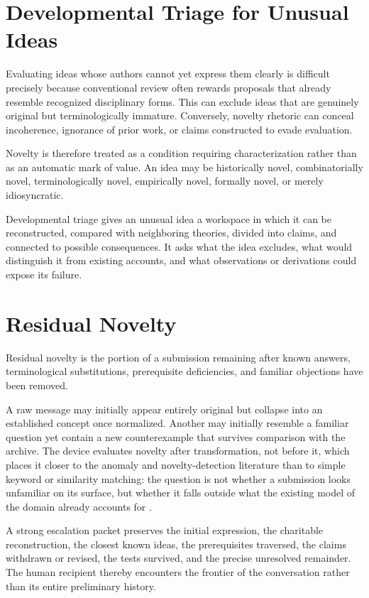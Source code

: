 \documentclass[11pt]{article}
\begin{document}
\section{Developmental Triage for Unusual Ideas}

Evaluating ideas whose authors cannot yet express them clearly is difficult precisely because conventional review often rewards proposals that already resemble recognized disciplinary forms. This can exclude ideas that are genuinely original but terminologically immature. Conversely, novelty rhetoric can conceal incoherence, ignorance of prior work, or claims constructed to evade evaluation.

Novelty is therefore treated as a condition requiring characterization rather than as an automatic mark of value. An idea may be historically novel, combinatorially novel, terminologically novel, empirically novel, formally novel, or merely idiosyncratic.

Developmental triage gives an unusual idea a workspace in which it can be reconstructed, compared with neighboring theories, divided into claims, and connected to possible consequences. It asks what the idea excludes, what would distinguish it from existing accounts, and what observations or derivations could expose its failure.

\section{Residual Novelty}

Residual novelty is the portion of a submission remaining after known answers, terminological substitutions, prerequisite deficiencies, and familiar objections have been removed.

A raw message may initially appear entirely original but collapse into an established concept once normalized. Another may initially resemble a familiar question yet contain a new counterexample that survives comparison with the archive. The device evaluates novelty after transformation, not before it, which places it closer to the anomaly and novelty-detection literature than to simple keyword or similarity matching: the question is not whether a submission looks unfamiliar on its surface, but whether it falls outside what the existing model of the domain already accounts for \cite{markou2003a,markou2003b}.

A strong escalation packet preserves the initial expression, the charitable reconstruction, the closest known ideas, the prerequisites traversed, the claims withdrawn or revised, the tests survived, and the precise unresolved remainder. The human recipient thereby encounters the frontier of the conversation rather than its entire preliminary history.
\end{document}
